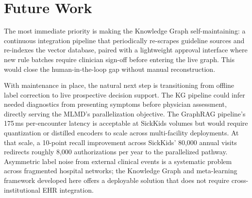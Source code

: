 
\section{Future Work}

The most immediate priority is making the Knowledge Graph self-maintaining: a continuous integration pipeline that periodically re-scrapes guideline sources and re-indexes the vector database, paired with a lightweight approval interface where new rule batches require clinician sign-off before entering the live graph. This would close the human-in-the-loop gap without manual reconstruction.

With maintenance in place, the natural next step is transitioning from offline label correction to live prospective decision support. The KG pipeline could infer needed diagnostics from presenting symptoms before physician assessment, directly serving the MLMD's parallelization objective. The GraphRAG pipeline's 175\,ms per-encounter latency is acceptable at SickKids volumes but would require quantization or distilled encoders to scale across multi-facility deployments. At that scale, a 10-point recall improvement across SickKids' 80,000 annual visits redirects roughly 8,000 authorizations per year to the parallelized pathway. Asymmetric label noise from external clinical events is a systematic problem across fragmented hospital networks; the Knowledge Graph and meta-learning framework developed here offers a deployable solution that does not require cross-institutional EHR integration.

